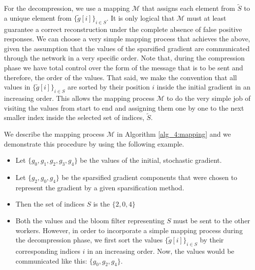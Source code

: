             For the decompression, we use a mapping $\mathcal{M}$ that assigns each element from $\tilde{S}$ to a unique element from $\{\tilde{g}[i]\}_{i\in S}$.
            It is only logical that $\mathcal{M}$ must at least guarantee a correct reconstruction under the complete absence of false positive responses. 
            We can choose a very simple mapping process that achieves the above, given the assumption that the values of the sparsified gradient are communicated through the network in a very specific order. 
            Note that, during the compression phase we have total control over the form of the message that is to be sent and therefore, the order of the values.
            That said, we make the convention that all values in $\{\tilde{g}[i]\}_{i\in S}$ are sorted by their position $i$ inside the initial gradient in an increasing order.
            This allows the mapping process $\mathcal{M}$ to do the very simple job of visiting the values from start to end and assigning them one by one to the next smaller index inside the selected set of indices, $\tilde{S}$.
            
            We describe the mapping process $\mathcal{M}$ in Algorithm \ref{alg_4:mapping} 
            and we demonstrate this procedure by using the following example.
            \begin{itemize}
                \item Let $\{g_0,g_1,g_2,g_3,g_4\}$ be the values of the initial, stochastic gradient.
                \item Let $\{g_2,g_0,g_4\}$ be the sparsified gradient components that were chosen to represent the gradient by a given sparsification method.
                \item Then the set of indices $S$ is the $\{2,0,4\}$ %
                \item Both the values and the bloom filter representing $S$ must be sent to the other workers. However, in order to incorporate a simple mapping process during the decompression phase, we first sort the values $\{\tilde{g}[i]\}_{i\in S}$ by their corresponding indices $i$ in an increasing order. 
                Now, the values would be communicated like this: $\{g_0,g_2,g_4\}$.
            \end{itemize}
            

